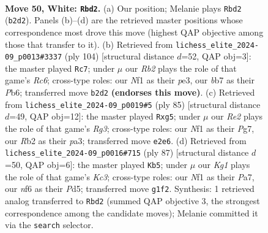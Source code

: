 \documentclass[11pt]{article}
\begin{document}
\clearpage

\begin{figure}[p]\centering
\begin{subfigure}{0.46\textwidth}\centering
\resizebox{\linewidth}{!}{%
\newchessgame
\chessboard[
  setfen={8/1b3pk1/5np1/8/7P/3q4/1R2R2P/5NK1 w - - 7 50},
  showmover=false,
  pgfstyle=straightmove, color=movearrow, markmove={b2-d2}
]}
\caption{}
\end{subfigure}\hfill
\begin{subfigure}{0.46\textwidth}\centering
\resizebox{\linewidth}{!}{%
\newchessgame
\chessboard[
  setfen={8/1K2qpk1/1PR5/8/8/2R1p1P1/8/8 w - - 2 53},
  showmover=false,
  pgfstyle=straightmove, color=movearrow, markmove={c6-c7}
]}
\caption{}
\end{subfigure}
\\[4pt]
\begin{subfigure}{0.46\textwidth}\centering
\resizebox{\linewidth}{!}{%
\newchessgame
\chessboard[
  setfen={8/5kp1/p5r1/6Q1/5K2/P4P1P/6P1/8 b - - 2 43},
  showmover=false,
  pgfstyle=straightmove, color=movearrow, markmove={g6-g5}
]}
\caption{}
\end{subfigure}\hfill
\begin{subfigure}{0.46\textwidth}\centering
\resizebox{\linewidth}{!}{%
\newchessgame
\chessboard[
  setfen={2Q5/p2rr3/1pk5/3p4/8/4P3/PP3PKP/8 b - - 25 44},
  showmover=false,
  pgfstyle=straightmove, color=movearrow, markmove={c6-b5}
]}
\caption{}
\end{subfigure}
\caption{\textbf{Move 50, White: \texttt{Rbd2}.} (a) Our position; Melanie plays \texttt{Rbd2} (\texttt{b2d2}). Panels (b)--(d) are the retrieved master positions whose correspondence most drove this move (highest QAP objective among those that transfer to it). (b) Retrieved from \texttt{lichess\_elite\_2024-09\_p0013\#3337} (ply 104) [structural distance $d$=52, QAP obj=3]: the master played \texttt{Rc7}; under $\mu$ our \emph{Rb2} plays the role of that game's \emph{Rc6}; cross-type roles: our \emph{N}f1 as their \emph{p}e3, our \emph{b}b7 as their \emph{P}b6; transferred move \texttt{b2d2} \textbf{(endorses this move)}. (c) Retrieved from \texttt{lichess\_elite\_2024-09\_p0019\#5} (ply 85) [structural distance $d$=49, QAP obj=12]: the master played \texttt{Rxg5}; under $\mu$ our \emph{Re2} plays the role of that game's \emph{Rg3}; cross-type roles: our \emph{N}f1 as their \emph{P}g7, our \emph{R}b2 as their \emph{p}a3; transferred move \texttt{e2e6}. (d) Retrieved from \texttt{lichess\_elite\_2024-09\_p0016\#715} (ply 87) [structural distance $d$=50, QAP obj=6]: the master played \texttt{Kb5}; under $\mu$ our \emph{Kg1} plays the role of that game's \emph{Kc3}; cross-type roles: our \emph{N}f1 as their \emph{P}a7, our \emph{n}f6 as their \emph{P}d5; transferred move \texttt{g1f2}. Synthesis: 1 retrieved analog transferred to \texttt{Rbd2} (summed QAP objective 3, the strongest correspondence among the candidate moves); Melanie committed it via the \texttt{search} selector.}
\label{fig:thought-m98}
\end{figure}
\end{document}
